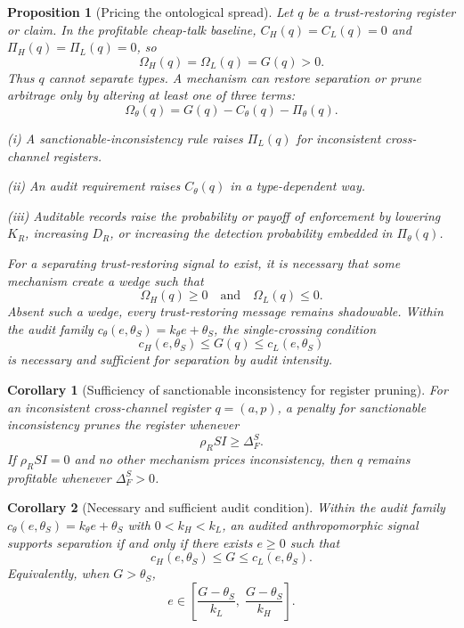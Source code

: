 \documentclass[preprint,authoryear]{elsarticle}
\newtheorem{proposition}{Proposition}
\newtheorem{corollary}{Corollary}
\theoremstyle{definition}
\theoremstyle{plain}
\begin{document}
\begin{proposition}[Pricing the ontological spread]
\label{prop:pricing}
Let $q$ be a trust-restoring register or claim.  In the profitable cheap-talk
baseline, $C_H(q)=C_L(q)=0$ and $\Pi_H(q)=\Pi_L(q)=0$, so
\[
\Omega_H(q)=\Omega_L(q)=G(q)>0.
\]
Thus $q$ cannot separate types.  A mechanism can restore separation or prune
arbitrage only by altering at least one of three terms:
\[
\Omega_\theta(q)=G(q)-C_\theta(q)-\Pi_\theta(q).
\]

\emph{(i)} A sanctionable-inconsistency rule raises $\Pi_L(q)$ for inconsistent
cross-channel registers.

\emph{(ii)} An audit requirement raises $C_\theta(q)$ in a type-dependent way.

\emph{(iii)} Auditable records raise the probability or payoff of enforcement by
lowering $K_R$, increasing $D_R$, or increasing the detection probability
embedded in $\Pi_\theta(q)$.

\noindent
For a separating trust-restoring signal to exist, it is necessary that some
mechanism create a wedge such that
\[
\Omega_H(q)\ge 0 \quad \text{and} \quad \Omega_L(q)\le 0.
\]
Absent such a wedge, every trust-restoring message remains shadowable.
Within the audit family $c_\theta(e,\theta_S)=k_\theta e+\theta_S$,
the single-crossing condition
\[
c_H(e,\theta_S)\le G(q)\le c_L(e,\theta_S)
\]
is necessary and sufficient for separation by audit intensity.
\end{proposition}

\begin{corollary}[Sufficiency of sanctionable inconsistency for register pruning]
\label{cor:inconsistency-pruning}
For an inconsistent cross-channel register $q=(a,p)$, a
penalty for sanctionable inconsistency prunes the register whenever
\[
\rho_R SI \ge \Delta_F^S.
\]
If $\rho_R SI=0$ and no other mechanism prices inconsistency, then $q$
remains profitable whenever $\Delta_F^S>0$.
\end{corollary}

\begin{corollary}[Necessary and sufficient audit condition]
\label{cor:audit-separation}
Within the audit family $c_\theta(e,\theta_S)=k_\theta e+\theta_S$ with
$0<k_H<k_L$, an audited anthropomorphic signal supports separation if and
only if there exists $e\ge 0$ such that
\[
c_H(e,\theta_S)\le G\le c_L(e,\theta_S).
\]
Equivalently, when $G>\theta_S$,
\[
e\in
\left[
\frac{G-\theta_S}{k_L},\;
\frac{G-\theta_S}{k_H}
\right].
\]
\end{corollary}
\end{document}
